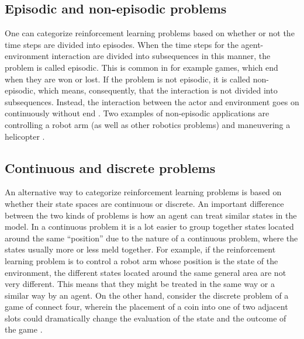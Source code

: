 \subsection{Episodic and non-episodic problems}
One can categorize reinforcement learning problems based on whether or not the time steps are divided into episodes. When the time steps for the agent-environment interaction are divided into subsequences in this manner, the problem is called episodic. This is common in for example games, which end when they are won or lost. If the problem is not episodic, it is called non-episodic, which means, consequently, that the interaction is not divided into subsequences. Instead, the interaction between the actor and environment goes on continuously without end \parencite{barto1998reinforcement}. Two examples of non-episodic applications are controlling a robot arm (as well as other robotics problems) and maneuvering a helicopter \parencite{ng2006autonomous}. 

\subsection{Continuous and discrete problems}
An alternative way to categorize reinforcement learning problems is based on whether their state spaces are continuous or discrete. An important difference between the two kinds of problems is how an agent can treat similar states in the model. In a continuous problem it is a lot easier to group together states located around the same ``position'' due to the nature of a continuous problem, where the states usually more or less meld together. For example, if the reinforcement learning problem is to control a robot arm whose position is the state of the environment, the different states located around the same general area are not very different. This means that they might be treated in the same way or a similar way by an agent. On the other hand, consider the discrete problem of a game of connect four, wherein the placement of a coin into one of two adjacent slots could dramatically change the evaluation of the state and the outcome of the game \parencite{barto1998reinforcement}.
